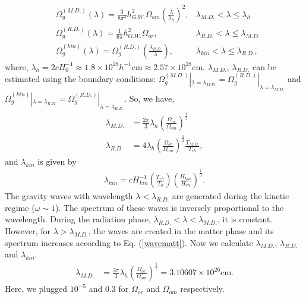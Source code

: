 \documentclass[prd,twocolumn,superscriptaddress]{revtex4}
\begin{document}
\begin{appendices}
\begin{align}
&\Omega_g^{(M.D.)} (\lambda) = \frac{3}{8 \pi^3} h_{G.W.}^2 \Omega_{om} { \left( \frac{\lambda}{\lambda_h} \right) }^2, \label{wavematt}
&\lambda_{M.D.} < \lambda \leq \lambda_{h} \\ 
&\Omega_g^{(R.D.)} (\lambda) = \frac{1}{6 \pi} h_{G.W.}^2 \Omega_{or}, &\lambda_{R.D.} < \lambda \leq \lambda_{M.D.} \label{waverd}\\ 
&\Omega_g^{(kin)} (\lambda) = \Omega_g^{(R.D.)} \left( \frac{\lambda_{R.D.}}{\lambda} \right),
&\lambda_{kin} < \lambda \leq \lambda_{R.D.} , \label{wavekin}
\end{align}
where, $\lambda_{h} = 2 c H_{0}^{-1} \approx 1.8 \times 10^{28} h^{-1} \mbox{cm} \approx 2.57 \times 10^{28} \mbox{cm} $. 
$\lambda_{M.D.}$, $\lambda_{R.D.}$  can be estimated using the boundary conditions: $\Omega_g^{(M.D.)} |_{\lambda = \lambda_{M.D.}} = \Omega_g^{(R.D.)} |_{\lambda = \lambda_{M.D.}}$
and
$\Omega_g^{(kin)} |_{\lambda = \lambda_{R.D.}} = \Omega_g^{(R.D.)} |_{\lambda = \lambda_{R.D.}}$. So, we have,
\begin{align}
\lambda_{M.D.} &=\frac{2 \pi}{3} \lambda_h {\left( \frac{\Omega_{or}}{\Omega_{om}} \right)}^{\frac{1}{2}} \\
\lambda_{R.D.} &=4 \lambda_h {\left( \frac{\Omega_{or}}{\Omega_{om}} \right)}^{\frac{1}{2}} 
\frac{T_{M.D.}}{T_{rh}},
\end{align}
and $\lambda_{kin} $ is given by
\begin{align}
\lambda_{kin} = c H^{-1}_{kin} \left( \frac{T_{rh}}{T_0} \right) { \left( \frac{H_{kin}}{H_{rh}} \right) }^{\frac{1}{3}}.
\end{align}
The gravity waves with wavelength $\lambda < \lambda_{R.D.}$ are generated during the  kinetic regime
($\omega \sim 1 $). The spectrum of these waves is inversely proportional to the wavelength. During the radiation phase,
$\lambda_{R.D.}< \lambda<\lambda_{M.D.}$, it is constant. However, for $\lambda > \lambda_{M.D.}$, the waves are created in the 
matter phase and its spectrum increases according to Eq. (\ref{wavematt}). Now we calculate $\lambda_{M.D.}$, $\lambda_{R.D.}$ and
$\lambda_{kin}$.
\begin{align}
\lambda_{M.D.} &=\frac{2 \pi}{3} \lambda_h {\left( \frac{\Omega_{or}}{\Omega_{om}} \right)}^{\frac{1}{2}} 
= 3.10607 \times 10^{26} \mbox{cm}   .
\end{align}
Here, we plugged $10^{-5}$ and $0.3$ for $\Omega_{or}$ and $\Omega_{om}$ respectively.
\begin{align}

\end{align}
\end{appendices}
\end{document}
